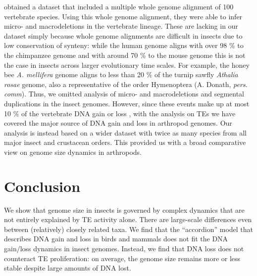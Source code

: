 \citet{Kapusta2017a} obtained a dataset that included a multiple whole
genome alignment of 100 vertebrate species. Using this whole genome
alignment, they were able to infer micro- and macrodeletions in the
vertebrate lineage. These are lacking in our dataset simply because
whole genome alignments are difficult in insects due to low conservation
of synteny: while the human genome aligns with over 98 \% to the
chimpanzee genome and with around 70 \% to the mouse genome
\citep{Mural2002} this is not the case in insects across larger
evolutionary time scales. For example, the honey bee \emph{A. mellifera}
genome aligns to less than 20 \% of the turnip sawfly \emph{Athalia
rosae} genome, also a representative of the order Hymenoptera (A.
Donath, \emph{pers. comm}). Thus, we omitted analysis of micro- and
macrodeletions and segmental duplications in the insect genomes.
However, since these events make up at most 10 \% of the vertebrate DNA
gain or loss \citep{Kapusta2017a}, with the analysis on TEs we have
covered the major source of DNA gain and loss in arthropod genomes. Our
analysis is instead based on a wider dataset with twice as many species
from all major insect and crustacean orders. This provided us with a
broad comparative view on genome size dynamics in arthropods.

\section{Conclusion}

We show that genome size in insects is governed by complex dynamics that
are not entirely explained by TE activity alone. There are large-scale
differences even between (relatively) closely related taxa. We find that
the ``accordion'' model that describes DNA gain and loss in birds and
mammals \citep{Kapusta2017a} does not fit the DNA gain/loss dynamics in
insect genomes. Instead, we find that DNA loss does not counteract TE
proliferation: on average, the genome size remains more or less stable
despite large amounts of DNA lost.




